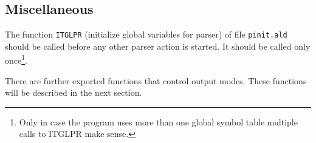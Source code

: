 \subsection{Miscellaneous}
The function {\tt ITGLPR} (initialize global variables for parser) of file
{\tt pinit.ald} should be called before any other parser action
is started.
It should be called only once\footnote{Only in case the program uses
more than one global symbol table multiple calls to ITGLPR make sense.}.

There are further exported functions that control output modes. These functions
will be described in the next section.
